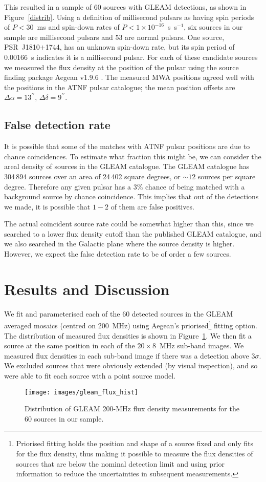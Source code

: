 \documentclass{pasa}%
\newcommand{\changed}[1]{{#1}}
\begin{document}
This resulted in a sample of 60 sources with GLEAM detections, as shown in Figure~\ref{distrib}. Using a definition of millisecond pulsars as having spin periods of $P<30$~ms and spin-down rates of $\dot P <1\times10^{-16}$~s~s$^{-1}$, six sources in our sample are millisecond pulsars and 53 are normal pulsars. One source, PSR~J1810$+$1744, has an unknown spin-down rate, but its spin period of 0.00166~s indicates it is a millisecond pulsar. For each of these candidate sources we measured the flux density at the position of the pulsar using the source finding package {\sc Aegean} v1.9.6 \citep{hancock12}.
\changed{The measured MWA positions agreed well with the positions in the ATNF pulsar catalogue; the mean position offsets are $\Delta \alpha = 13^{\prime\prime}$, $\Delta \delta = 9^{\prime\prime}$.}

\subsection{False detection rate}
It is possible that some of the matches with ATNF pulsar positions are due to chance coincidences. To estimate what fraction this might be, we can consider the areal density of sources in the GLEAM catalogue.
The GLEAM catalogue has 304\,894 sources over an area of 24\,402 square degrees, or $\sim 12$ sources per square degree. Therefore any given pulsar has a $3\%$ chance of being matched with a background source by chance coincidence. This implies that out of the detections we made, it is possible that $1-2$ of them are false positives.

The actual coincident source rate could be somewhat higher than this, since we searched to a lower flux density cutoff than the published GLEAM catalogue, and we also searched in the Galactic plane where the source density is higher. However, we expect the false detection rate to be of order a few sources.

\section{Results and Discussion}\label{s_results}
We fit and parameterised each of the 60 detected sources in the GLEAM averaged mosaics (centred on 200~MHz) using {\sc Aegean}'s priorised\footnote{Priorised fitting holds the position and shape of a source fixed and only fits for the flux density, thus making it possible to measure the flux densities of sources that are below the nominal detection limit and using prior information to reduce the uncertainties in subsequent measurements.} fitting option. The distribution of measured flux densities is shown in Figure~\ref{fhist}. We then fit a source at the same position in each of the $20\times 8$~MHz sub-band images. We measured flux densities in each sub-band image if there was a detection above $3\sigma$. We excluded sources that were obviously extended (by visual inspection), and so were able to fit each source with a point source model.
\begin{figure}[t!]
\texttt{[image: images/gleam\_flux\_hist]}
\caption{Distribution of GLEAM 200-MHz flux density measurements for the 60 sources in our sample.}
\label{fhist}
\end{figure}
\end{document}
